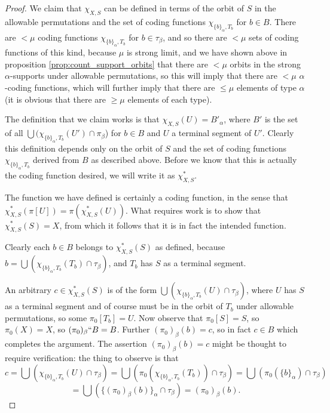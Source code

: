 \documentclass[112pt]{article}
\theoremstyle{definition}
\theoremstyle{remark}
\begin{document}
\begin{proof}
We claim that $\chi_{X,S}$ can be defined in terms of the orbit of $S$ in the allowable permutations and the set of coding functions $\chi_{\{b\}_\alpha,T_b}$ for $b \in B$.  There are $<\mu$ coding functions $\chi_{\{b\}_\alpha,T_b}$ for $b \in \tau_\beta$, and so there are $<\mu$ sets of coding functions of this kind, because $\mu$ is strong limit, and we have shown above in proposition \ref{prop:count_support_orbits} that there are $<\mu$ orbits in the strong $\alpha$-supports under allowable permutations, so this will imply that there are $<\mu$ $\alpha$-coding functions, which will further imply that there are $\leq \mu$ elements of type $\alpha$ (it is obvious that there are $\geq \mu$ elements of each type).


The definition that we claim works is that $\chi_{X,S}(U) = B'_\alpha$, where $B'$ is the set of all $\bigcup (\chi_{\{b\}_\alpha,T_b}(U')\cap \pi_\beta$) for $b \in B$ and $U$ a terminal segment of  $U'$.  Clearly this definition depends only on the orbit of $S$ and the set of coding functions $\chi_{\{b\}_\alpha,T_b}$ derived from $B$ as described above.  Before we know that this is actually the coding function desired, we will write it as $\chi_{X,S}^*$.

The function we have defined is certainly a coding function, in the sense that $\chi_{X,S}^*(\pi[U]) = \pi(\chi_{X,S}^*(U))$.  What requires work is to show that
$\chi_{X,S}^*(S)=X$, from which it follows that it is in fact the intended function.

Clearly each $b \in B$ belongs to $\chi^*_{X,S}(S)$ as defined, because \newline $b = \bigcup (\chi_{\{b\}_\alpha,T_b}(T_b)\cap \tau_{\beta})$, and $T_b$ has $S$ as a terminal segment.

An arbitrary $c \in \chi_{X,S}^*(S)$ is of the form $\bigcup (\chi_{\{b\}_\alpha,T_b}(U)\cap \tau_{\beta})$, where $U$ has $S$ as a terminal segment and of course must be in the orbit of $T_b$ under allowable permutations, so some $\pi_0[T_b] = U$. Now observe that $\pi_0[S]=S$, so $\pi_0(X)=X$, so
$(\pi_0)_\beta``B=B$.  Further $(\pi_0)_\beta(b) = c$, so in fact $c \in B$ which completes the argument.  The assertion $(\pi_0)_\beta(b) = c$ might be thought to require verification:   the thing to observe is that
$$c=\bigcup (\chi_{\{b\}_\alpha,T_b}(U) \cap \tau_\beta)=\bigcup(\pi_0(\chi_{\{b\}_\alpha,T_b}(T_b))\cap \tau_\beta)=
\bigcup (\pi_0(\{b\}_\alpha)\cap \tau_\beta) $$
$$=\bigcup(\{(\pi_0)_\beta(b)\}_{\alpha} \cap \tau_\beta) = (\pi_0)_\beta(b).$$



\end{proof}
\end{document}
